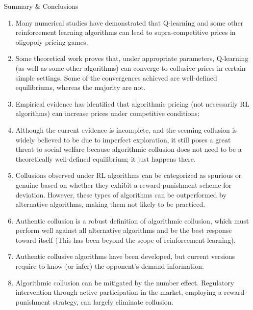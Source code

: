 \documentclass[8pt]{beamer}
\begin{document}
\begin{frame}{Summary \& Conclusions}
    \small{
    \begin{enumerate}
        \item Many numerical studies have demonstrated that Q-learning and some other reinforcement learning algorithms can lead to supra-competitive prices in oligopoly pricing games.
        \item Some theoretical work proves that, under appropriate parameters, Q-learning (as well as some other algorithms) can converge to collusive prices in certain simple settings. Some of the convergences achieved are well-defined equilibriums, whereas the majority are not.
        \item Empirical evidence has identified that algorithmic pricing (not necessarily RL algorithms) can increase prices under competitive conditions;
        \item Although the current evidence is incomplete, and the seeming collusion is widely believed to be due to imperfect exploration, it still poses a great threat to social welfare because algorithmic collusion does not need to be a theoretically well-defined equilibrium; it just happens there.
        \item Collusions observed under RL algorithms can be categorized as spurious or genuine based on whether they exhibit a reward-punishment scheme for deviation. However, these types of algorithms can be outperformed by alternative algorithms, making them not likely to be practiced.
        \item Authentic collusion is a robust definition of algorithmic collusion, which must perform well against all alternative algorithms and be the best response toward itself (This has been beyond the scope of reinforcement learning). 
        \item Authentic collusive algorithms have been developed, but current versions require to know (or infer) the opponent's demand information. 
        \item Algorithmic collusion can be mitigated by the number effect. Regulatory intervention through active participation in the market, employing a reward-punishment strategy, can largely eliminate collusion.
    \end{enumerate}
    }
\end{frame}
\end{document}
